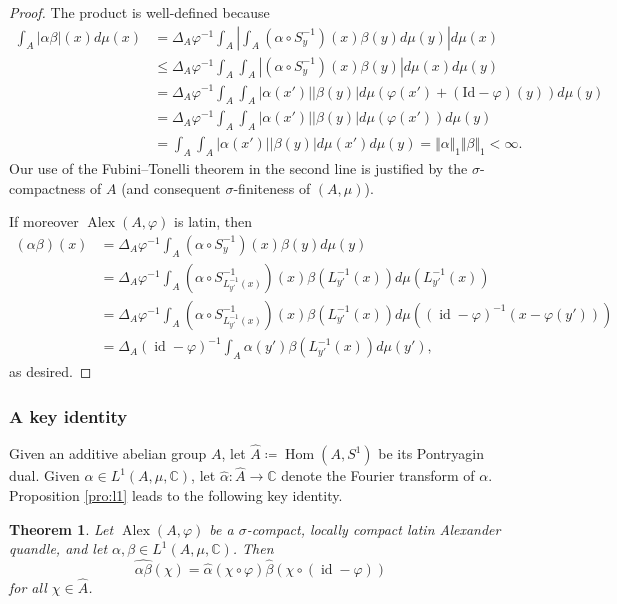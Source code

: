 \documentclass[12pt]{amsart}
\newtheorem{thm}{Theorem}[section]
\theoremstyle{definition}
\theoremstyle{remark}
\newcommand{\Id}{\operatorname{id}}
\newcommand\Hom{\operatorname{Hom}}
\newcommand{\C}{\mathbb{C}}
\newcommand{\A}{\widehat{A}}
\newcommand{\Alpha}{\widehat{\alpha}}
\renewcommand{\phi}{\varphi}
\def\Alex{\operatorname{Alex}}
\begin{document}
\begin{proof}
    The product is well-defined because
    \begin{align*}
        \int_A |\alpha \beta|(x) d\mu(x) &= \Delta_A\phi^{-1}\int_A  \left|\int_{ A}(\alpha \circ S_y^{-1})(x)\beta(y)d\mu(y)  \right| d\mu(x)\\
        &\leq\Delta_A\phi^{-1}\int_A   \int_{ A}\left|(\alpha \circ S_y^{-1})(x)\beta(y) \right| d\mu(x)   d\mu(y)\\
        &=\Delta_A\phi^{-1}\int_A   \int_{ A}|\alpha (x')||\beta(y)| d\mu(\phi(x') +(\text{Id}-\phi)(y) )   d\mu(y)\\
        &=\Delta_A\phi^{-1}\int_A   \int_{ A}|\alpha (x')||\beta(y)| d\mu(\phi(x')   )   d\mu(y)\\
        &=\int_A   \int_{ A}|\alpha (x')||\beta(y)| d\mu(x'   )   d\mu(y)   = \Vert \alpha \Vert_1 \Vert \beta \Vert_1 < \infty.
    \end{align*}
    Our use of the Fubini--Tonelli theorem in the second line is justified by the $\sigma$-compactness of $A$ (and consequent $\sigma$-finiteness of $(A,\mu)$). 

    If moreover $\Alex(A,\phi)$ is latin, then 
    \begin{align*}
        (\alpha \beta)(x) &= \Delta_A\phi^{-1}\int_{ A}(\alpha \circ S_y^{-1})(x) \beta(y)d\mu(y)\\
        &=\Delta_A\phi^{-1}\int_{ A}(\alpha \circ S_{L_{y'}^{-1}(x)}^{-1})(x) \beta(L_{y'}^{-1}(x))d\mu(L_{y'}^{-1}(x))\\
        &= \Delta_A\phi^{-1}\int_{ A}(\alpha \circ S_{L_{y'}^{-1}(x)}^{-1})(x) \beta(L_{y'}^{-1}(x))d\mu((\Id -\varphi)^{-1}(x - \varphi(y')))\\
        &= \Delta_A(\Id-\phi)^{-1} \int_{ A}\alpha (y')   \beta(L_{y'}^{-1}(x))d\mu(y'),
    \end{align*}
    as desired.
\end{proof}

\subsubsection{A key identity}
Given an additive abelian group $A$, let $\A\coloneq\Hom(A,S^1)$ be its Pontryagin dual. Given $\alpha\in L^1(A,\mu,\C)$, let $\Alpha\colon\A\to\C$ denote the Fourier transform of $\alpha$. Proposition \ref{pro:l1} leads to the following key identity.

\begin{thm} 
    Let $\Alex(A,\phi)$ be a $\sigma$-compact, locally compact latin Alexander quandle, and let $\alpha,\beta\in L^1(A,\mu,\mathbb{C}) $. Then
    \[
    \widehat{\alpha \beta} (\chi)=\Alpha (\chi\circ\phi)\hat{\beta} (\chi\circ(\Id-\phi))
    \]
    for all $\chi\in\A$.
\end{thm}
\end{document}
